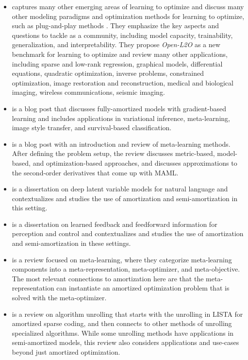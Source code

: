 \documentclass[twoside,11pt]{article}
\begin{document}
\begin{itemize}
\item \citet{chen2021learning} captures many other emerging areas
  of learning to optimize and discuss many other modeling paradigms
  and optimization methods for learning to optimize, such as
  plug-and-play methods \citep{venkatakrishnan2013plug,meinhardt2017learning,rick2017one,zhang2017learning}.
  They emphasize the key aspects and questions to tackle as a community,
  including model capacity, trainability, generalization, and
  interpretability.
  They propose \emph{Open-L2O} as a new benchmark for
  learning to optimize and review many other applications,
  including sparse and low-rank regression, graphical models,
  differential equations, quadratic optimization, inverse problems,
  constrained optimization, image restoration and reconstruction,
  medical and biological imaging, wireless communications,
  seismic imaging.
\item \citet{shu2017amortized} is a blog post that discusses
  fully-amortized models with gradient-based learning
  and includes applications in variational inference,
  meta-learning, image style transfer,
  and survival-based classification.
\item \citet{weng2018metalearning} is a blog post
  with an introduction and review of meta-learning methods.
  After defining the problem setup, the review discusses
  metric-based, model-based, and optimization-based approaches,
  and discusses approximations to the second-order derivatives
  that come up with MAML.
\item \citet{kim2020deep} is a dissertation on deep
  latent variable models for natural language
  and contextualizes and studies the use of amortization and
  semi-amortization in this setting.
\item \citet{marino2021learned} is a dissertation on learned
  feedback and feedforward information for perception and control
  and contextualizes and studies the use of amortization and
  semi-amortization in these settings.
\item \citet{hospedales2020meta} is a review focused on meta-learning,
  where they categorize meta-learning components into a
  meta-representation, meta-optimizer, and meta-objective.
  The most relevant connections to amortization here are that
  the meta-representation can instantiate an
  amortized optimization problem that is solved with the
  meta-optimizer.
\item \citet{monga2021algorithm} is a review on
  algorithm unrolling that starts with the unrolling
  in LISTA \citep{gregor2010learning} for amortized
  sparse coding, and then connects to other methods
  of unrolling specialized algorithms.
  While some unrolling methods have applications in
  semi-amortized models, this review also considers
  applications and use-cases beyond just
  amortized optimization.
\end{itemize}
\end{document}

